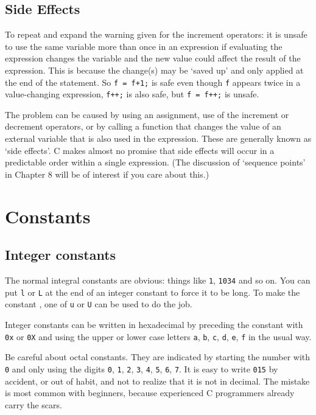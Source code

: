   

  \subsection{Side Effects}
   

   To repeat and expand the warning given for the increment operators: it
    is unsafe to use the same variable more than once in an expression if
    evaluating the expression changes the variable and the new value could
    affect the result of the expression. This is because the change(s) may be
    `saved up' and only applied at the end of the statement.
    So \texttt{f = f+1;} is safe even though \texttt{f}
    appears twice in a value-changing expression, \texttt{f++;} is
    also safe, but \texttt{f = f++;} is unsafe.


   The problem can be caused by using an assignment, use of the increment
    or decrement operators, or by calling a function that changes the value of
    an external variable that is also used in the expression. These are
    generally known as `side effects'. C makes almost no promise
    that side effects will occur in a predictable order within a single
    expression. (The discussion of `sequence points' in Chapter 8 will be of interest if you care about this.)


  

 
        \section{Constants}
        

  

  \subsection{Integer constants}
   

   The normal integral constants are obvious: things
    like \texttt{1}, \texttt{1034} and so on. You can
    put \texttt{l} or \texttt{L} at the end of an integer
    constant to force it to be long. To make the constant
    \unsigned, one of \texttt{u} or \texttt{U}
    can be used to do the job.


   Integer constants can be written in hexadecimal by preceding the
    constant with \texttt{0x} or \texttt{0X} and using the
    upper or lower case letters \texttt{a}, \texttt{b},
    \texttt{c}, \texttt{d}, \texttt{e}, \texttt{f} in the
    usual way.


   Be careful about octal constants. They are indicated by starting the
    number with \texttt{0} and only using the
    digits \texttt{0}, \texttt{1}, \texttt{2},
    \texttt{3}, \texttt{4}, \texttt{5}, \texttt{6},
    \texttt{7}. It is easy to write \texttt{015} by accident, or
    out of habit, and not to realize that it is not in decimal. The mistake is
    most common with beginners, because experienced C programmers already
    carry the scars.


